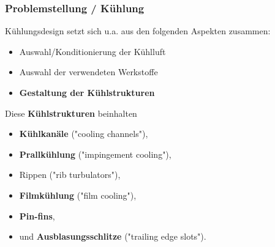 \documentclass[8pt, aspectratio=169]{beamer}
\begin{document}
\begin{frame}
	\frametitle{Problemstellung / Kühlung}
	\vspace{-1cm}\hspace{-0.5cm}
	\begin{minipage}[t]{0.5\textwidth}
		Kühlungsdesign setzt sich u.a. aus den folgenden Aspekten zusammen:
		\begin{itemize}
			\item Auswahl/Konditionierung der Kühlluft
			\item Auswahl der verwendeten Werkstoffe
			\item \textbf{Gestaltung der Kühlstrukturen}
		\end{itemize}
		\vspace{1em}
		Diese \textbf{Kühlstrukturen} beinhalten
		\begin{itemize}
			\item \textbf{Kühlkanäle} ("cooling channels"),
			\item \textbf{Prallkühlung} ("{}impingement cooling"),
			\item Rippen ("rib turbulators"),
			\item \textbf{Filmkühlung} ("film cooling"),
			\item \textbf{Pin-fins},
			\item und \textbf{Ausblasungsschlitze} ("trailing edge slots").
		\end{itemize}
	\end{minipage}
	\begin{minipage}[t]{0.48\textwidth}
			\begin{figure}[H]
			\centering
			\begin{subfigure}{.49\textwidth}
				\centering

\end{subfigure}
\end{figure}
\end{minipage}
\end{frame}
\end{document}
